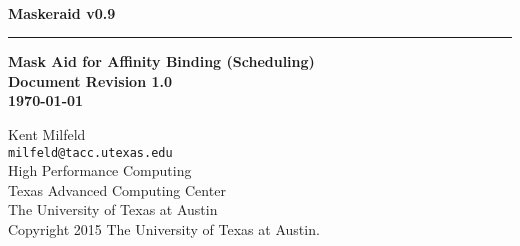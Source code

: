 \documentclass[10pt,a4paper]{report}
\begin{document}
\begin{titlepage}
\thispagestyle{empty}	%
\verb+ +
\vspace{1em}
\begin{flushright}
\huge\bf Maskeraid v0.9\\
\rule{\textwidth}{4pt}
\large{\bf Mask Aid for Affinity Binding (Scheduling)\\
Document Revision 1.0\\
\today}
\end{flushright}

\newpage
\thispagestyle{empty}
\begin{flushleft}
Kent Milfeld \\
\verb+milfeld@tacc.utexas.edu+\\
\vspace{0.5em}
High Performance Computing \\
Texas Advanced Computing Center\\
The University of Texas at Austin\\
\vspace{1cm}
Copyright 2015 The University of Texas at Austin.
\end{flushleft}
\newpage
\end{titlepage}
\end{document}
